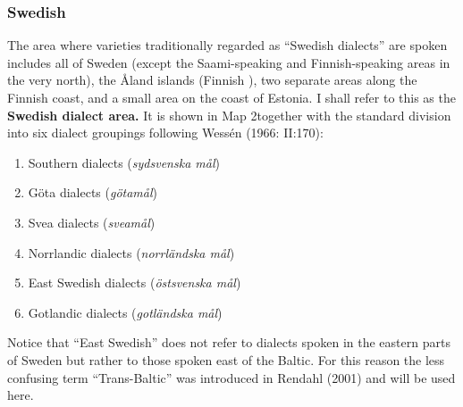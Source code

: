 \subsubsection[Swedish]{\rmfamily Swedish}
\label{bkm:Ref108607742}%
The area where varieties traditionally regarded as “Swedish dialects” are spoken includes all of Sweden (except the Saami-speaking and Finnish-speaking areas in the very north), the Åland islands (Finnish ), two separate areas along the Finnish coast, and a small area on the coast of Estonia. I shall refer to this as the \textbf{Swedish dialect area.} It is shown in Map 2together with the standard division into six dialect groupings following Wessén (1966: II:170): 

\begin{enumerate} %
\item 
Southern dialects (\textit{sydsvenska mål})

\item 
Göta dialects (\textit{götamål})

\item 
Svea dialects (\textit{sveamål})

\item 
Norrlandic dialects (\textit{norrländska mål})

\item 
East Swedish dialects (\textit{östsvenska mål})

\item 
Gotlandic dialects (\textit{gotländska mål})

\end{enumerate} %
Notice that “East Swedish” does not refer to dialects spoken in the eastern parts of Sweden but rather to those spoken east of the Baltic. For this reason the less confusing term “Trans-Baltic” was introduced in Rendahl (2001) and will be used here.

